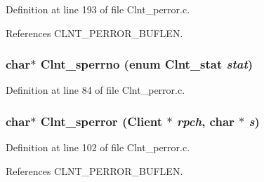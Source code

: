 Definition at line 193 of file Clnt\_\-perror.c.

References CLNT\_\-PERROR\_\-BUFLEN.
\subsubsection{\setlength{\rightskip}{0pt plus 5cm}char$\ast$ Clnt\_\-sperrno (enum Clnt\_\-stat {\em stat})}\label{Clnt__perror_8c_a6}




Definition at line 84 of file Clnt\_\-perror.c.
\subsubsection{\setlength{\rightskip}{0pt plus 5cm}char$\ast$ Clnt\_\-sperror (Client $\ast$ {\em rpch}, char $\ast$ {\em s})}\label{Clnt__perror_8c_a8}




Definition at line 102 of file Clnt\_\-perror.c.

References CLNT\_\-PERROR\_\-BUFLEN.